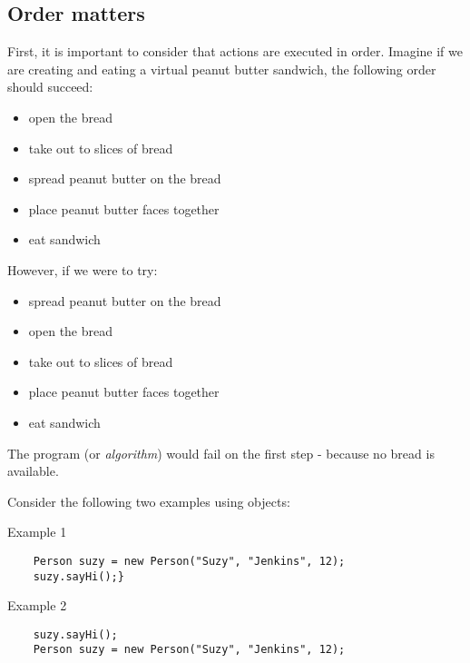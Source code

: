 \documentclass{article}
\begin{document}
\begin{flushleft}
\subsection{Order matters}
First, it is important to consider that actions are executed in order. Imagine if we are creating and eating a virtual peanut butter sandwich, the following order should succeed:
\begin{itemize}
\item open the bread
\item take out to slices of bread
\item spread peanut butter on the bread
\item place peanut butter faces together
\item eat sandwich
\end{itemize}
However, if we were to try:
\begin{itemize}
\item spread peanut butter on the bread
\item open the bread
\item take out to slices of bread
\item place peanut butter faces together
\item eat sandwich
\end{itemize}
The program (or \emph{algorithm}) would fail on the first step - because no bread is available.\par
Consider the following two examples using objects:
\begin{tcolorbox}[enhanced,breakable, before upper={\let\clearpage\relax}, width=5in,center upper,fontupper=\bfseries,drop fuzzy shadow southeast,boxrule=0.4pt,sharp corners,colframe=aliceblue!80!black,colback=gray!10]

  {\Large Example 1}
  \begin{verbatim}
    Person suzy = new Person("Suzy", "Jenkins", 12);
    suzy.sayHi();}
  \end{verbatim}
\end{tcolorbox}



\begin{tcolorbox}[enhanced,breakable, before upper={\let\clearpage\relax}, width=5in,center upper,fontupper=\bfseries,drop fuzzy shadow southeast,boxrule=0.4pt,sharp corners,colframe=pink!80!red,colback=pink!10]
  {\Large Example 2}
  \begin{verbatim}
    suzy.sayHi();
    Person suzy = new Person("Suzy", "Jenkins", 12);
  \end{verbatim}
\end{tcolorbox}


\end{flushleft}
\end{document}
